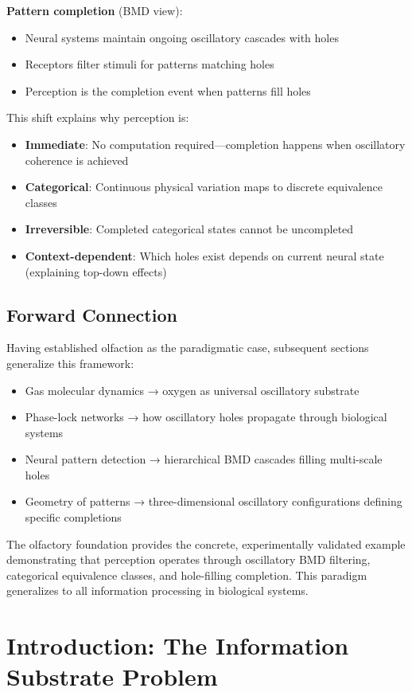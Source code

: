\documentclass[12pt,a4paper]{article}
\begin{document}
\textbf{Pattern completion} (BMD view):
\begin{itemize}
\item Neural systems maintain ongoing oscillatory cascades with holes
\item Receptors filter stimuli for patterns matching holes
\item Perception is the completion event when patterns fill holes
\end{itemize}

This shift explains why perception is:
\begin{itemize}
\item \textbf{Immediate}: No computation required—completion happens when oscillatory coherence is achieved
\item \textbf{Categorical}: Continuous physical variation maps to discrete equivalence classes
\item \textbf{Irreversible}: Completed categorical states cannot be uncompleted
\item \textbf{Context-dependent}: Which holes exist depends on current neural state (explaining top-down effects)
\end{itemize}

\subsection{Forward Connection}

Having established olfaction as the paradigmatic case, subsequent sections generalize this framework:
\begin{itemize}
\item Gas molecular dynamics → oxygen as universal oscillatory substrate
\item Phase-lock networks → how oscillatory holes propagate through biological systems
\item Neural pattern detection → hierarchical BMD cascades filling multi-scale holes
\item Geometry of patterns → three-dimensional oscillatory configurations defining specific completions
\end{itemize}

The olfactory foundation provides the concrete, experimentally validated example demonstrating that perception operates through oscillatory BMD filtering, categorical equivalence classes, and hole-filling completion. This paradigm generalizes to all information processing in biological systems.

\section{Introduction: The Information Substrate Problem}
\end{document}
